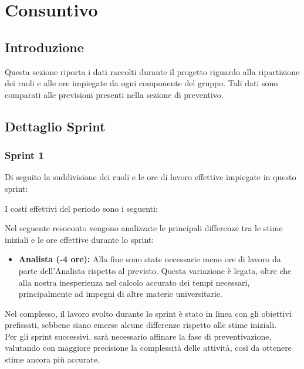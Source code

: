 \section{Consuntivo}
\subsection{Introduzione}
Questa sezione riporta i dati raccolti durante il progetto riguardo alla ripartizione dei ruoli e alle ore impiegate da ogni componente del gruppo. Tali dati sono comparati alle previsioni presenti nella sezione di preventivo.

\subsection{Dettaglio Sprint}

\subsubsection{Sprint 1}
Di seguito la suddivisione dei ruoli e le ore di lavoro effettive impiegate in questo sprint:




I costi effettivi del periodo sono i seguenti:




Nel seguente resoconto vengono analizzate le principali differenze tra le stime iniziali e le ore effettive durante lo sprint:
\begin{itemize}
    \item \textbf{Analista (-4 ore):} Alla fine sono state necessarie meno ore di lavoro da parte 
    dell'Analista rispetto al previsto. Questa variazione è legata, oltre che alla nostra inesperienza nel calcolo 
    accurato dei tempi necessari, principalmente ad impegni di altre materie universitarie.

\end{itemize}
Nel complesso, il lavoro svolto durante lo sprint è stato in linea con gli obiettivi prefissati, sebbene siano emerse alcune differenze rispetto alle stime iniziali.
\\
Per gli sprint successivi, sarà necessario affinare la fase di preventivazione, valutando con 
maggiore precisione la complessità delle attività, così da ottenere stime ancora più accurate.

